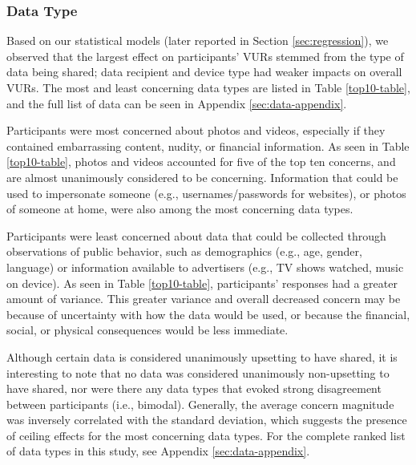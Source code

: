
\subsubsection{Data Type}
\label{sec:datatypes}

Based on our statistical models (later reported in Section \ref{sec:regression}), we observed that the largest effect on participants' VURs stemmed from the type of data being shared; data recipient and device type had weaker impacts on overall VURs. The most and least concerning data types are listed in Table \ref{top10-table}, and the full list of data can be seen in Appendix \ref{sec:data-appendix}. 

Participants were most concerned about photos and videos, especially if they contained embarrassing content, nudity, or financial information. As seen in Table \ref{top10-table}, photos and videos accounted for five of the top ten concerns, and are almost unanimously considered to be concerning. Information that could be used to impersonate someone (e.g., usernames/passwords for websites), or photos of someone at home, were also among the most concerning data types. 

Participants were least concerned about data that could be collected through observations of public behavior, such as demographics (e.g., age, gender, language) or information available to advertisers (e.g., TV shows watched, music on device). As seen in Table \ref{top10-table}, participants' responses had a greater amount of variance.  This greater variance and overall decreased concern may be because of uncertainty with how the data would be used, or because the financial, social, or physical consequences would be less immediate.

Although certain data is considered unanimously upsetting to have shared, it is interesting to note that no data was considered unanimously non-upsetting to have shared, nor were there any data types that evoked strong disagreement between participants (i.e., bimodal). Generally, the average concern magnitude was inversely correlated with the standard deviation, which suggests the presence of ceiling effects for the most concerning data types. For the complete ranked list of data types in this study, see Appendix \ref{sec:data-appendix}.

